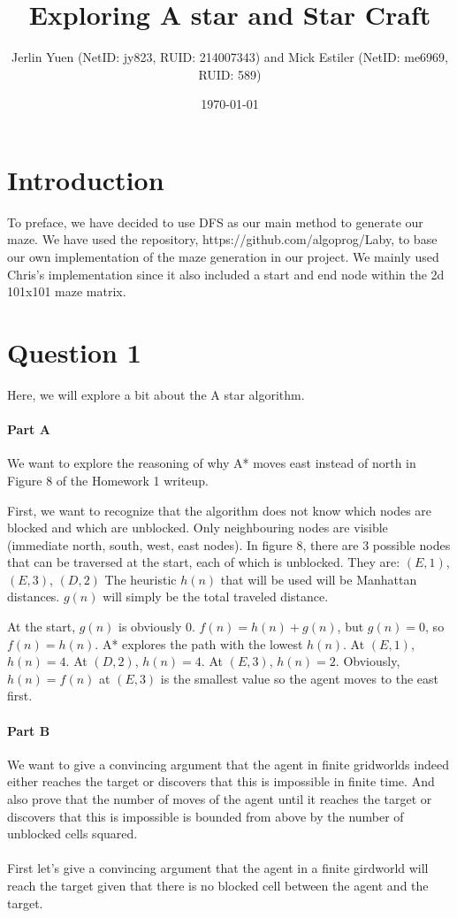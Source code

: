 \documentclass{article}
\title{Exploring A star and Star Craft}
\author{Jerlin Yuen (NetID: jy823, RUID: 214007343) and Mick Estiler (NetID: me6969, RUID: 589)}
\date{\today} %
\begin{document}
\maketitle

\section{Introduction}
To preface, we have decided to use DFS as our main method to generate our maze. We have used the repository, https://github.com/algoprog/Laby, to base our own implementation of the maze generation in our project. We mainly used Chris's implementation since it also included a start and end node within the 2d 101x101 maze matrix.

\section{Question 1}
Here, we will explore a bit about the A star algorithm.

\paragraph{Part A}

We want to explore the reasoning of why A* moves east instead of north in Figure 8 of the Homework 1 writeup.

First, we want to recognize that the algorithm does not know which nodes are blocked and which are unblocked. Only neighbouring nodes are visible (immediate north, south, west, east nodes). In figure 8, there are 3 possible nodes that can be traversed at the start, each of which is unblocked. They are: \((E, 1)\), \((E, 3)\), \((D, 2)\) The heuristic \(h(n)\) that will be used will be Manhattan distances. \(g(n)\) will simply be the total traveled distance. 

At the start, \(g(n)\) is obviously 0. \(f(n) = h(n) + g(n)\), but \(g(n) = 0\), so \(f(n) = h(n)\). A* explores the path with the lowest \(h(n)\). At \((E,1)\), \(h(n) = 4\). At \((D,2)\), \(h(n) = 4\). At \((E,3)\), \(h(n) = 2\). Obviously, \(h(n) = f(n)\) at \((E,3)\) is the smallest value so the agent moves to the east first.

\paragraph{Part B}
We want to give a convincing argument that the agent in finite gridworlds indeed either reaches the target or discovers that this is impossible in finite time. And also prove that the number of moves of the agent until it reaches the target or discovers that this is impossible is bounded from above by the number of unblocked cells squared. 
\\
\\
First let's give a convincing argument that the agent in a finite girdworld will reach the target given that there is no blocked cell between the agent and the target. 
\end{document}
